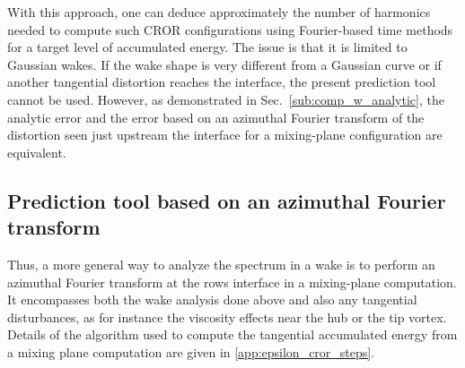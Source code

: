 With this approach, one can deduce approximately
the number of harmonics needed to compute such CROR
configurations using Fourier-based time methods for a target level
of accumulated energy. The issue is that it is limited to
Gaussian wakes. If the wake shape is very different from a Gaussian
curve or if another tangential
distortion reaches the interface, the present
prediction tool cannot be used. 
However, as demonstrated in Sec.~\ref{sub:comp_w_analytic},
the analytic error and the error based on an
azimuthal Fourier transform of the distortion
seen just upstream the interface for a mixing-plane
configuration are equivalent. 


\subsection{Prediction tool based on an azimuthal Fourier transform}
Thus, a more general way to analyze the spectrum in a wake is
to perform an azimuthal Fourier transform at the rows interface
in a mixing-plane computation. It encompasses both the wake analysis done above and also
any tangential disturbances, as for instance
the viscosity effects near the hub or the tip vortex.
Details of the algorithm used to compute the tangential accumulated
energy from a mixing plane computation are given in \ref{app:epsilon_cror_steps}.

